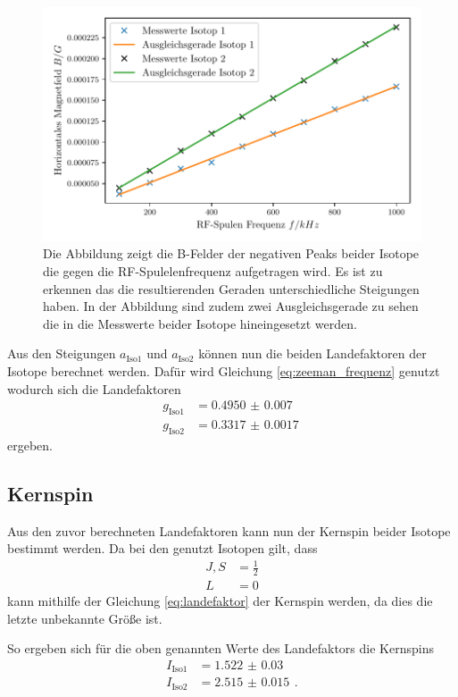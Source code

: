 \begin{figure}
    \centering
    \includegraphics[width=\textwidth]{content/plots/landefaktor.pdf}
    \caption{Die Abbildung zeigt die B-Felder der negativen Peaks beider Isotope die gegen die RF-Spulelenfrequenz aufgetragen wird.
    Es ist zu erkennen das die resultierenden Geraden unterschiedliche Steigungen haben.
    In der Abbildung sind zudem zwei Ausgleichsgerade zu sehen die in die Messwerte beider Isotope hineingesetzt werden.}
    \label{fig:lande}
\end{figure}
Aus den Steigungen $a_\text{Iso1}$ und $a_\text{Iso2}$ können nun die beiden Landefaktoren der Isotope berechnet werden.
Dafür wird Gleichung \eqref{eq:zeeman_frequenz} genutzt wodurch sich die Landefaktoren
\begin{align*}
    g_\text{Iso1} &= \SI{0.4950(70)}{}\\
    g_\text{Iso2} &= \SI{ 0.3317(17)}{}
\end{align*}
ergeben.
\subsection{Kernspin}
Aus den zuvor berechneten Landefaktoren kann nun der Kernspin beider Isotope bestimmt werden.
Da bei den genutzt Isotopen gilt, dass 
\begin{align*}
    J, S &= \frac{1}{2}\\
    L &= 0
\end{align*}
kann mithilfe der Gleichung \eqref{eq:landefaktor} der Kernspin werden, da dies die letzte unbekannte Größe ist.

So ergeben sich für die oben genannten Werte des Landefaktors die Kernspins 
\begin{align*}
    I_\text{Iso1} &= \SI{1.522(30)}{}\\
    I_\text{Iso2} &= \SI{2.515(15)}{} \, .
\end{align*}

